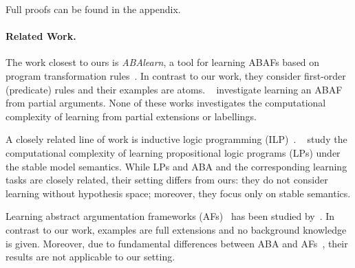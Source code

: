 \documentclass[letterpaper]{article} %
\newif\ifappendix
\begin{document}

Full proofs can be found in the appendix.

\paragraph{Related Work.}
The work closest to ours is \emph{ABAlearn},
a tool for learning ABAFs based on program transformation rules~\cite{ProiettiT22,JacobKAGPT25,AngelisPT25,VasileiadisAPT25}. 
In contrast to our work, they consider first-order (predicate) rules and their examples are atoms.
\citeauthor{PopescuW25}~ investigate learning an ABAF from partial arguments.
None of these works investigates the computational complexity of learning from partial extensions or labellings. 


A closely related line of work is inductive logic programming (ILP)~\cite{MUGGLETON1994629}. \citeauthor{LawRB18}~ study the computational complexity of learning propositional logic programs (LPs) under the stable model semantics.
While LPs and ABA and the corresponding learning tasks are closely related, their setting differs from ours: 
they do not consider learning without hypothesis space; moreover, they focus only on stable semantics. 

Learning abstract argumentation frameworks (AFs)~\cite{Dung95} has been studied by~\cite{BengelTR24,NiskanenWJ19}. 
In contrast to our work, examples are full extensions and no background knowledge is given. 
Moreover, due to fundamental differences between ABA and AFs~\cite{Prakken23,RapbergerU23}, their results are not applicable to our setting. 
\end{document}
